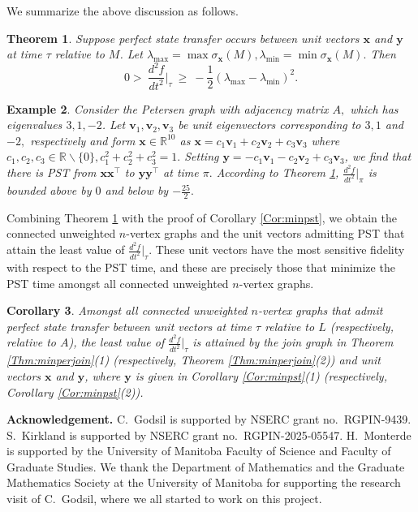 \documentclass[11pt]{article}
\newtheorem{theorem}{Theorem}
\newtheorem{corollary}[theorem]{Corollary}
\newtheorem{example}[theorem]{Example}
\newcommand{\bv}{\mathbf v}
\newcommand{\bx}{\mathbf x}
\newcommand{\by}{\mathbf y}
\def\R{\mathbb{R}}
\begin{document}
We summarize the above discussion as follows. 

\begin{theorem}
\label{thm:sens}
Suppose perfect state transfer occurs between unit vectors $\bx$ and $\by$ at time $\tau$ relative to $M$. Let $\lambda_{\max} = \max \sigma_{\bx}(M), \lambda_{\min} = \min \sigma_{\bx}(M).$ Then $$0 > \
\frac{d^2f}{dt^2}\bigg|_{\tau}\ \ge 
 \ -\frac{1}{2}(\lambda_{\max} - \lambda_{\min} )^2.$$
\end{theorem}
 
\begin{example}
Consider the Petersen graph with adjacency matrix $A,$ which has eigenvalues $3, 1, -2$. Let $\bv_1, \bv_2, \bv_3$ be unit eigenvectors corresponding to $3, 1$ and $-2,$ respectively and form $\bx\in \R^{10}$ as $\bx=c_1\bv_1 + c_2 \bv_2+c_3\bv_3$ where $c_1, c_2, c_3\in \R\backslash\{0\}, c_1^2+c_2^2+c_3^2=1.$ Setting $\by=-c_1\bv_1 - c_2 \bv_2+c_3\bv_3$, we find that there is PST from $\bx\bx^\top$ to $\by\by^\top$ at time $\pi.$ According to Theorem \ref{thm:sens}, $\frac{d^2f}{dt^2}\Big|_{\pi}$ is bounded above by $0$ and below by $-\frac{25}{2}.$
\end{example} 

Combining Theorem \ref{thm:sens} with the proof of Corollary \ref{Cor:minpst}, we obtain the connected unweighted $n$-vertex graphs and the unit vectors admitting PST that attain the least value of $\frac{d^2f}{dt^2}\bigg|_{\tau}$. These unit vectors have the most sensitive fidelity with respect to the PST time, and these are precisely those that minimize the PST time amongst all connected unweighted $n$-vertex graphs.

\begin{corollary}
\label{cor:sens1} 
Amongst all connected unweighted $n$-vertex graphs that admit perfect state transfer between unit vectors at time $\tau$ relative to $L$ (respectively, relative to $A$), the least value of $\frac{d^2f}{dt^2}\bigg|_{\tau}$ is attained by the join graph in Theorem \ref{Thm:minperjoin}(1) (respectively, Theorem \ref{Thm:minperjoin}(2)) and unit vectors $\bx$ and $\by$, where $\by$ is given in Corollary \ref{Cor:minpst}(1) (respectively, Corollary \ref{Cor:minpst}(2)).
\end{corollary}

\bigskip

\noindent \textbf{Acknowledgement.}
C.\ Godsil is supported by NSERC grant no.\ RGPIN-9439. S.\ Kirkland is supported by NSERC grant no.\ RGPIN-2025-05547. H.\ Monterde is supported by the University of Manitoba Faculty of Science and Faculty of Graduate Studies. We thank the Department of Mathematics and the Graduate Mathematics Society at the University of Manitoba for supporting the research visit of C.\ Godsil, where we all started to work on this project.



\end{document}
